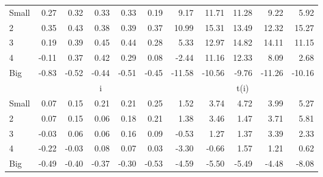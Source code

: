 \begin{table}[!ht]
\begin{tabular}{lrrrrrrrrrr}
    \\
      \cmidrule(r){2-6} \cmidrule(r){7-11}

    Small   & 0.27  & 0.32  & 0.33  & 0.33  & 0.19  & 9.17  & 11.71  & 11.28  & 9.22  & 5.92  \\
         2  & 0.35  & 0.43  & 0.38  & 0.39  & 0.37  & 10.99  & 15.31  & 13.49  & 12.32  & 15.27  \\
         3  & 0.19  & 0.39  & 0.45  & 0.44  & 0.28  & 5.33  & 12.97  & 14.82  & 14.11  & 11.15  \\
         4  & -0.11  & 0.37  & 0.42  & 0.29  & 0.08  & -2.44  & 11.16  & 12.33  & 8.09  & 2.68  \\
    Big     & -0.83  & -0.52  & -0.44  & -0.51  & -0.45  & -11.58  & -10.56  & -9.76  & -11.26  & -10.16  \\

  
    
      & \multicolumn{5}{c}{i} & \multicolumn{5}{c}{t(i)}
    
    \\
      \cmidrule(r){2-6} \cmidrule(r){7-11}

    Small   & 0.07  & 0.15  & 0.21  & 0.21  & 0.25  & 1.52  & 3.74  & 4.72  & 3.99  & 5.27  \\
         2  & 0.07  & 0.15  & 0.06  & 0.18  & 0.21  & 1.38  & 3.46  & 1.47  & 3.71  & 5.81  \\
         3  & -0.03  & 0.06  & 0.06  & 0.16  & 0.09  & -0.53  & 1.27  & 1.37  & 3.39  & 2.33  \\
         4  & -0.22  & -0.03  & 0.08  & 0.07  & 0.03  & -3.30  & -0.66  & 1.57  & 1.21  & 0.62  \\
    Big     & -0.49  & -0.40  & -0.37  & -0.30  & -0.53  & -4.59  & -5.50  & -5.49  & -4.48  & -8.08  \\

  

  \bottomrule
\end{tabular}
\label{tbl:25_Size_Var_FF2015}
\end{table}